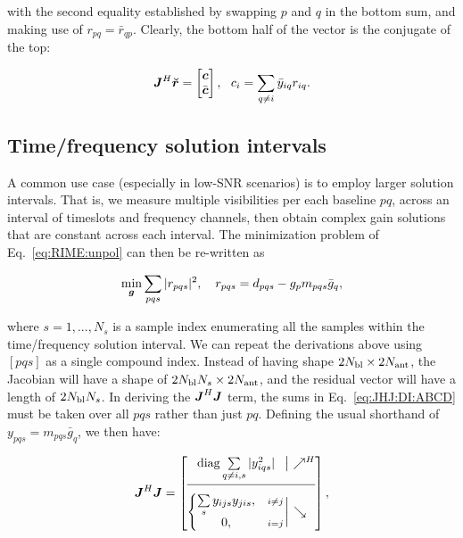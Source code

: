 \documentclass[useAMS,usenatbib]{mn2e}
\newcommand{\mat}[1]{{\bmath{#1}}}
\newcommand{\JJ}{\mat{J}} %
\newcommand{\JHJ}{\JJ^H\JJ} %
\begin{document}
with the second equality established by swapping $p$ and $q$ in the bottom sum, and making use of $r_{pq}=\bar{r}_{qp}$. Clearly, the bottom half of the vector is the conjugate of the top:

\begin{equation}
\label{eq:JHR:DI1}
\JJ^H\Rr = \Matrix{c}{\bmath{c}\\\bar{\bmath{c}}},~~c_i = \sum\limits_{q\ne i} \bar{y}_{iq} r_{iq}.
\end{equation}


\subsection{Time/frequency solution intervals}
\label{sec:unpol:DI:avg}
\label{sec:solution-intervals}

\newcommand{\Ns}{N_s}

A common use case (especially in low-SNR scenarios) is to employ larger solution intervals. 
That is, we measure multiple visibilities per each baseline $pq$, across an interval of timeslots and
frequency channels, then obtain complex gain solutions that are constant across each interval. The 
minimization problem of Eq.~\ref{eq:RIME:unpol} can then be re-written as

\begin{equation}
\label{eq:cal:DI:tf}
\min_{\bmath{g}}\sum_{pqs}|r_{pqs}|^2, 
~~~r_{pqs} = d_{pqs}-g_p m_{pqs} \bar{g}_q, 
\end{equation}

where $s=1,...,N_s$ is a sample index enumerating all the samples within the 
time/frequency solution interval. We can repeat the derivations above using  $[pqs]$ as a
single compound index. Instead of having shape $2N_\mathrm{bl}\times2N_\mathrm{ant}$, the Jacobian 
will have a shape of $2\Nbl\Ns\times 2\Na$, and the residual vector will have a length of 
$2\Nbl\Ns$. In deriving the $\JHJ$ term, the sums in Eq.~\ref{eq:JHJ:DI:ABCD} must be taken over all $pqs$ 
rather than just $pq$. Defining the usual shorthand of 
$y_{pqs}=m_{pqs}\bar{g}_q$, we then have:

\begin{equation}
\label{eq:JHJ:DI:tf}
\JJ^H \JJ = 
\JHJblocks{
  \mathrm{diag} \sum\limits_{q\ne i,s} |y^2_{iqs}| 
}{
  \left \{ 
  \begin{array}{@{}cc@{}}
   \sum\limits_{s} y_{ijs}y_{jis},&{\scriptstyle i\ne j} \\
   0, &{\scriptstyle i=j}
  \end{array} \right . 
},
\end{equation}
\end{document}
